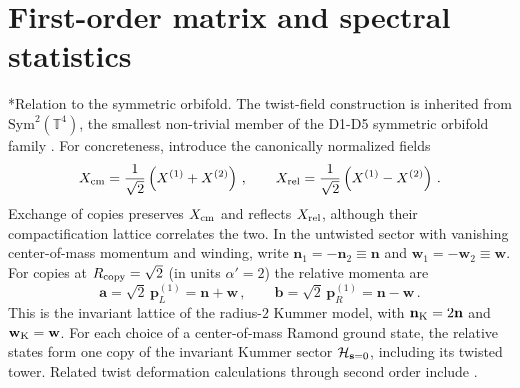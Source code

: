 \documentclass[aps,onecolumn,groupedaddress,nofootinbib,pra]{revtex4-2}
\makeatletter
\renewcommand\paragraph{\@startsection{paragraph}{4}{\parindent}{\z@}{-1em}{\normalfont\normalsize\bfseries}}
\newcommand{\Sym}{\mathrm{Sym}}
\newcommand{\Tf}{\mathbb T^4}
\newcommand{\bs}{\mathbf s}
\newcommand{\bn}{\mathbf n}
\newcommand{\ba}{\mathbf a}
\newcommand{\bb}{\mathbf b}
\newcommand{\bw}{\mathbf w}
\makeatother
\begin{document}
\section{First-order matrix and spectral statistics}
\label{app:firstorder}

\paragraph*{Relation to the symmetric orbifold.}
The twist-field construction is inherited from $\Sym^2(\Tf)$, the smallest non-trivial member of the D1-D5 symmetric orbifold family \cite{Larsen:1999uk,David:2002wn,Lunin:2001pw,Keller:2011xi,Hartman:2014oaa}. For concreteness, introduce the canonically normalized fields
\begin{equation}
X_{\rm cm}=\frac{1}{\sqrt{2}} \left(X^{(1)}+X^{(2)}\right)\,, \qquad
X_{\rm rel}=\frac{1}{\sqrt{2}} \left(X^{(1)}-X^{(2)}\right)\,.
\end{equation}
Exchange of copies preserves $X_{\rm cm}$ and reflects $X_{\rm rel}$, although their compactification lattice correlates the two. In the untwisted sector with vanishing center-of-mass momentum and winding, write $\bn_1=-\bn_2\equiv\bn$ and $\bw_1=-\bw_2\equiv\bw$.
For copies at $R_{\rm copy}=\sqrt2$ (in units $\alpha'=2$) the relative momenta are
\begin{equation}
\ba=\sqrt2\,\mathbf p_L^{(1)}=\bn+\bw\,, \qquad
\bb=\sqrt2\,\mathbf p_R^{(1)}=\bn-\bw \,.
\end{equation}
This is the invariant lattice of the radius-$2$ Kummer model, with $\bn_{\rm K}=2\bn$ and $\bw_{\rm K}=\bw$. For each choice of a center-of-mass Ramond ground state, the relative states form one copy of the invariant Kummer sector ${\cal H}_{\bs=0}$, including its twisted tower. Related twist deformation calculations through second order include
\cite{Gava:2002xb,Avery:2010er,Gaberdiel:2015uca,Keller:2019yrr,Keller:2019suk,Guo:2019ady,Guo:2020gxm}.\\
\end{document}
